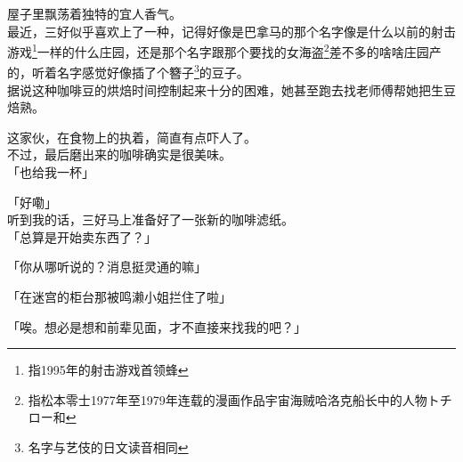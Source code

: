 屋子里飘荡着独特的宜人香气。\\

最近，三好似乎喜欢上了一种，记得好像是巴拿马的那个名字像是什么以前的射击游戏\footnote{指1995年的射击游戏首领蜂}一样的什么庄园，还是那个名字跟那个要找的女海盗\footnote{指松本零士1977年至1979年连载的漫画作品宇宙海贼哈洛克船长中的人物トチロー和}差不多的啥啥庄园产的，听着名字感觉好像插了个簪子\footnote{名字与艺伎的日文读音相同}的豆子。\\

据说这种咖啡豆的烘焙时间控制起来十分的困难，她甚至跑去找老师傅帮她把生豆焙熟。

这家伙，在食物上的执着，简直有点吓人了。\\

不过，最后磨出来的咖啡确实是很美味。\\

「也给我一杯」

「好嘞」\\

听到我的话，三好马上准备好了一张新的咖啡滤纸。\\

「总算是开始卖东西了？」

「你从哪听说的？消息挺灵通的嘛」

「在迷宫的柜台那被鸣濑小姐拦住了啦」

「唉。想必是想和前辈见面，才不直接来找我的吧？」\\

